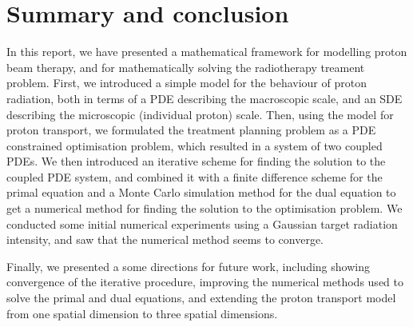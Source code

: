\section{Summary and conclusion}

In this report, we have presented a mathematical framework for modelling proton beam therapy, and for mathematically solving the radiotherapy treament problem. First, we introduced a simple model for the behaviour of proton radiation, both in terms of a PDE describing the macroscopic scale, and an SDE describing the microscopic (individual proton) scale. Then, using the model for proton transport, we formulated the treatment planning problem as a PDE constrained optimisation problem, which resulted in a system of two coupled PDEs. We then introduced an iterative scheme for finding the solution to the coupled PDE system, and combined it with a finite difference scheme for the primal equation and a Monte Carlo simulation method for the dual equation to get a numerical method for finding the solution to the optimisation problem. We conducted some initial numerical experiments using a Gaussian target radiation intensity, and saw that the numerical method seems to converge.

Finally, we presented a some directions for future work, including showing convergence of the iterative procedure, improving the numerical methods used to solve the primal and dual equations, and extending the proton transport model from one spatial dimension to three spatial dimensions.